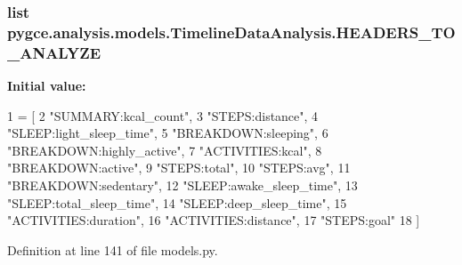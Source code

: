 \subsubsection[{\texorpdfstring{H\+E\+A\+D\+E\+R\+S\+\_\+\+T\+O\+\_\+\+A\+N\+A\+L\+Y\+ZE}{HEADERS_TO_ANALYZE}}]{\setlength{\rightskip}{0pt plus 5cm}list pygce.\+analysis.\+models.\+Timeline\+Data\+Analysis.\+H\+E\+A\+D\+E\+R\+S\+\_\+\+T\+O\+\_\+\+A\+N\+A\+L\+Y\+ZE\hspace{0.3cm}{\ttfamily [static]}}\hypertarget{classpygce_1_1analysis_1_1models_1_1_timeline_data_analysis_abc835b2b9b9d8555a2b49e8534782021}{}\label{classpygce_1_1analysis_1_1models_1_1_timeline_data_analysis_abc835b2b9b9d8555a2b49e8534782021}
{\bfseries Initial value\+:}
\begin{DoxyCode}
1 = [
2         \textcolor{stringliteral}{"SUMMARY:kcal\_count"},
3         \textcolor{stringliteral}{"STEPS:distance"},
4         \textcolor{stringliteral}{"SLEEP:light\_sleep\_time"},
5         \textcolor{stringliteral}{"BREAKDOWN:sleeping"},
6         \textcolor{stringliteral}{"BREAKDOWN:highly\_active"},
7         \textcolor{stringliteral}{"ACTIVITIES:kcal"},
8         \textcolor{stringliteral}{"BREAKDOWN:active"},
9         \textcolor{stringliteral}{"STEPS:total"},
10         \textcolor{stringliteral}{"STEPS:avg"},
11         \textcolor{stringliteral}{"BREAKDOWN:sedentary"},
12         \textcolor{stringliteral}{"SLEEP:awake\_sleep\_time"},
13         \textcolor{stringliteral}{"SLEEP:total\_sleep\_time"},
14         \textcolor{stringliteral}{"SLEEP:deep\_sleep\_time"},
15         \textcolor{stringliteral}{"ACTIVITIES:duration"},
16         \textcolor{stringliteral}{"ACTIVITIES:distance"},
17         \textcolor{stringliteral}{"STEPS:goal"}
18     ]
\end{DoxyCode}


Definition at line 141 of file models.\+py.

